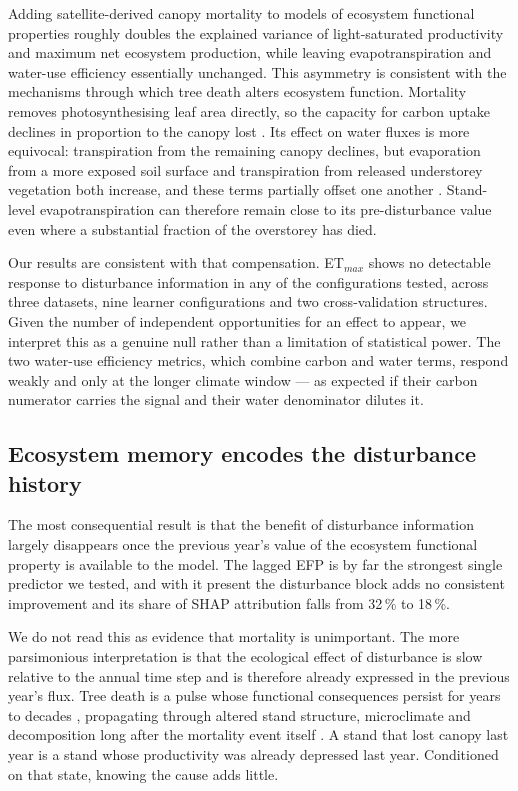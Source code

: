 \documentclass[pdflatex,sn-nature]{sn-jnl}%
\theoremstyle{thmstyleone}%
\theoremstyle{thmstyletwo}%
\theoremstyle{thmstylethree}%
\begin{document}
Adding satellite-derived canopy mortality to models of ecosystem functional properties roughly doubles the explained variance of light-saturated productivity and maximum net ecosystem production, while leaving evapotranspiration and water-use efficiency essentially unchanged. This asymmetry is consistent with the mechanisms through which tree death alters ecosystem function. Mortality removes photosynthesising leaf area directly, so the capacity for carbon uptake declines in proportion to the canopy lost \cite{hicke2012effects,edburg2012cascading}. Its effect on water fluxes is more equivocal: transpiration from the remaining canopy declines, but evaporation from a more exposed soil surface and transpiration from released understorey vegetation both increase, and these terms partially offset one another \cite{edburg2012cascading}. Stand-level evapotranspiration can therefore remain close to its pre-disturbance value even where a substantial fraction of the overstorey has died.

Our results are consistent with that compensation. ET$_{max}$ shows no detectable response to disturbance information in any of the configurations tested, across three datasets, nine learner configurations and two cross-validation structures. Given the number of independent opportunities for an effect to appear, we interpret this as a genuine null rather than a limitation of statistical power. The two water-use efficiency metrics, which combine carbon and water terms, respond weakly and only at the longer climate window --- as expected if their carbon numerator carries the signal and their water denominator dilutes it.

\subsection{Ecosystem memory encodes the disturbance history}

The most consequential result is that the benefit of disturbance information largely disappears once the previous year's value of the ecosystem functional property is available to the model. The lagged EFP is by far the strongest single predictor we tested, and with it present the disturbance block adds no consistent improvement and its share of SHAP attribution falls from 32\,\% to 18\,\%.

We do not read this as evidence that mortality is unimportant. The more parsimonious interpretation is that the ecological effect of disturbance is slow relative to the annual time step and is therefore already expressed in the previous year's flux. Tree death is a pulse whose functional consequences persist for years to decades \cite{jentsch_theory_2019,gough_disturbance_2024}, propagating through altered stand structure, microclimate and decomposition long after the mortality event itself \cite{edburg2012cascading}. A stand that lost canopy last year is a stand whose productivity was already depressed last year. Conditioned on that state, knowing the cause adds little.
\end{document}

